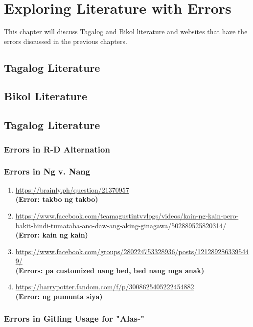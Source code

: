 \chapter{Exploring Literature with Errors}

This chapter will discuss Tagalog and Bikol literature and websites that have the errors discussed in the previous chapters.

\section{Tagalog Literature}

\section{Bikol Literature}


\section{Tagalog Literature}
\subsection{Errors in R-D Alternation}
\subsection{Errors in Ng v. Nang}

\begin{enumerate}
    \item \url{https://brainly.ph/question/21370957} \\
    \textbf{(Error: takbo ng takbo)}
    \item \url{https://www.facebook.com/teamagustintvvlogs/videos/kain-ng-kain-pero-bakit-hindi-tumataba-ano-daw-ang-aking-ginagawa/502889525820314/} \\
    \textbf{(Error: kain ng kain)}
    \item \url{https://www.facebook.com/groups/280224753328936/posts/1212892863395449/} \\
    \textbf{(Errors: pa customized nang bed, bed nang mga anak)}
    \item \url{https://harrypotter.fandom.com/f/p/3008625405222454882} \\
    \textbf{(Error: ng pumunta siya)}
\end{enumerate}

\subsection{Errors in Gitling Usage for "Alas-"}


